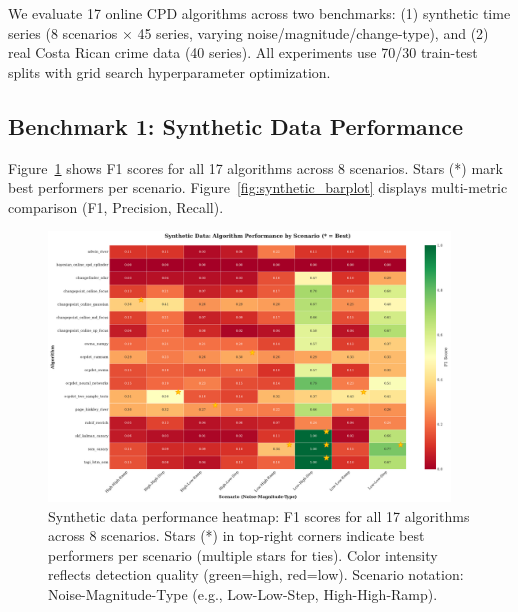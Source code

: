 \label{sec:results}

We evaluate 17 online CPD algorithms across two benchmarks: (1) synthetic time series (8 scenarios × 45 series, varying noise/magnitude/change-type), and (2) real Costa Rican crime data (40 series). All experiments use 70/30 train-test splits with grid search hyperparameter optimization.

\subsection{Benchmark 1: Synthetic Data Performance}
\label{sec:results_synthetic}

Figure~\ref{fig:synthetic_heatmap} shows F1 scores for all 17 algorithms across 8 scenarios. Stars (*) mark best performers per scenario. Figure~\ref{fig:synthetic_barplot} displays multi-metric comparison (F1, Precision, Recall).

\begin{figure}[H]
\centering
\includegraphics[width=0.95\textwidth]{figures/fig_synthetic_heatmap.pdf}
\caption{Synthetic data performance heatmap: F1 scores for all 17 algorithms across 8 scenarios. Stars (*) in top-right corners indicate best performers per scenario (multiple stars for ties). Color intensity reflects detection quality (green=high, red=low). Scenario notation: Noise-Magnitude-Type (e.g., Low-Low-Step, High-High-Ramp).}
\label{fig:synthetic_heatmap}
\end{figure}


